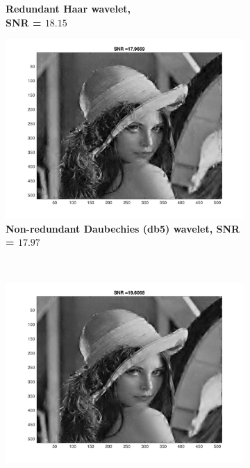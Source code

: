 \begin{figure}
\begin{subfigure}[b]{0.45\textwidth}
        \caption{\textbf{Redundant Haar wavelet, \\ SNR = $\mathbf{18.15}$} }
        \label{fig:matti_fig_rwt_haar}
    \end{subfigure}
    \begin{subfigure}[b]{0.45\textwidth}
        \includegraphics[width=\textwidth]{../src/inpainting/vraag_2_3_wt_db5}
        \caption{\textbf{Non-redundant Daubechies (db5) wavelet,  SNR = $\mathbf{17.97}$} }
        \label{fig:matti_fig_wt_db5}
    \end{subfigure}
    ~ %
    \begin{subfigure}[b]{0.45\textwidth}
        \includegraphics[width=\textwidth]{../src/inpainting/vraag_2_3_rwt_db5}

\end{subfigure}
\end{figure}
